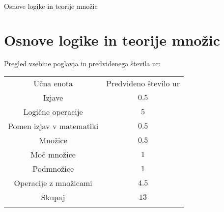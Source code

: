\begin{priprava}{0}{}{}{Osnove logike in teorije množic}{}{}
    
    \chapter{Osnove logike in teorije množic}

    \Large{Pregled vsebine poglavja in predvidenega števila ur:}

    \begin{table}[H]
        \centering
        \begin{tabular}{||c|c||} 
        \hhline{|t:==:t|}
        \rowcolor[rgb]{0.843,0.718,0.718} 
        Učna enota  & Predvideno število ur   \\ 
        \hhline{|:==:|}
        Izjave & $0.5$    \\ 
        \hline
        Logične operacije & $5$    \\ 
        \hline
        Pomen izjav v matematiki & $0.5$    \\ 
        \hline
        Množice & $0.5$     \\
        \hline
        Moč množice & $1$     \\
        \hline
        Podmnožice & $1$    \\ 
        \hline
        Operacije z množicami & $4.5$    \\ 
        \hhline{|:==:|}
        Skupaj & $13$     \\
        \hhline{|b:==:b|}
        \end{tabular}
    \end{table}


    
\end{priprava}